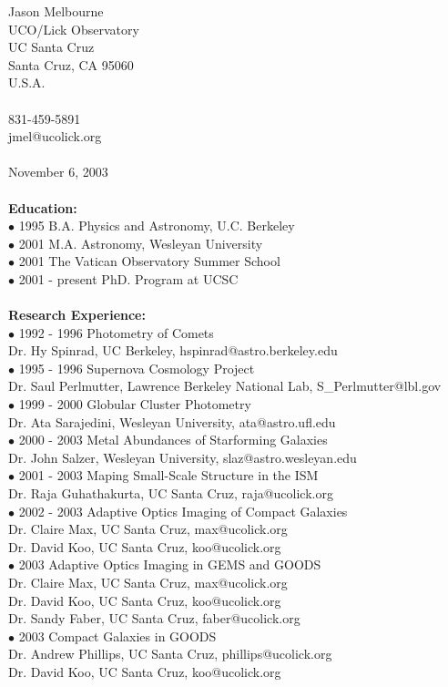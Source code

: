 \documentclass[12pt]{article}
\begin{document}
\pagestyle{myheadings}
\noindent
Jason Melbourne\\
UCO/Lick Observatory\\
UC Santa Cruz\\
Santa Cruz, CA 95060\\
U.S.A.\\\\
831-459-5891\\
jmel@ucolick.org\\\\
November 6, 2003\\\\
{\bf{Education:}}\\
\noindent
$\bullet$ 1995 B.A. Physics and Astronomy, U.C. Berkeley\\
$\bullet$ 2001 M.A. Astronomy, Wesleyan University\\
$\bullet$ 2001 The Vatican Observatory Summer School\\ 
$\bullet$ 2001 - present PhD. Program at UCSC\\\\
\noindent
{\bf{Research Experience:}}\\
$\bullet$ 1992 - 1996 Photometry of Comets\\
Dr. Hy Spinrad, UC Berkeley, hspinrad@astro.berkeley.edu\\
$\bullet$ 1995 - 1996 Supernova Cosmology Project\\
Dr. Saul Perlmutter, Lawrence Berkeley National Lab, S_Perlmutter@lbl.gov\\
$\bullet$ 1999 - 2000 Globular Cluster Photometry\\
Dr. Ata Sarajedini, Wesleyan University, ata@astro.ufl.edu\\
$\bullet$ 2000 - 2003 Metal Abundances of Starforming Galaxies\\
Dr. John Salzer, Wesleyan University, slaz@astro.wesleyan.edu\\
$\bullet$ 2001 - 2003 Maping Small-Scale Structure in the ISM\\
Dr. Raja Guhathakurta, UC Santa Cruz, raja@ucolick.org\\
$\bullet$ 2002 - 2003 Adaptive Optics Imaging of Compact Galaxies\\
Dr. Claire Max, UC Santa Cruz, max@ucolick.org\\ 
Dr. David Koo, UC Santa Cruz, koo@ucolick.org\\
$\bullet$ 2003 Adaptive Optics Imaging in GEMS and GOODS\\
Dr. Claire Max, UC Santa Cruz, max@ucolick.org\\ 
Dr. David Koo, UC Santa Cruz, koo@ucolick.org\\
Dr. Sandy Faber, UC Santa Cruz, faber@ucolick.org\\
$\bullet$ 2003 Compact Galaxies in GOODS\\
Dr. Andrew Phillips, UC Santa Cruz, phillips@ucolick.org\\ 
Dr. David Koo, UC Santa Cruz, koo@ucolick.org\\\\
\end{document}
